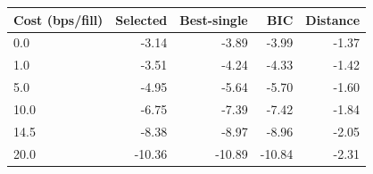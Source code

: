 \begin{tabular}{@{}lrrrr@{}}
\toprule
Cost (bps/fill) & Selected & Best-single & BIC & Distance \\
\midrule
0.0 & -3.14 & -3.89 & -3.99 & -1.37 \\
1.0 & -3.51 & -4.24 & -4.33 & -1.42 \\
5.0 & -4.95 & -5.64 & -5.70 & -1.60 \\
10.0 & -6.75 & -7.39 & -7.42 & -1.84 \\
14.5 & -8.38 & -8.97 & -8.96 & -2.05 \\
20.0 & -10.36 & -10.89 & -10.84 & -2.31 \\
\bottomrule
\end{tabular}
